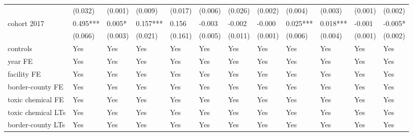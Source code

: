 \begin{table}[H]
{\begin{tabular}{@{}llllllllllll@{}}
            & (0.032)  & (0.001)         & (0.009)    & (0.017)               & (0.006)  & (0.026)   & (0.002)              & (0.004)               & (0.003)                   & (0.001)  & (0.002)   \\
            cohort 2017                 & 0.495*** & 0.005*          & 0.157***   & 0.156                 & -0.003   & -0.002    & -0.000               & 0.025***              & 0.018*** & -0.001 & -0.005*     \\
            & (0.066)  & (0.003)         & (0.021)    & (0.161)               & (0.005)  & (0.011)   & (0.001)              & (0.006)               & (0.004)                   & (0.001)  & (0.002)       \\
            controls                    & Yes      & Yes             & Yes        & Yes                   & Yes      & Yes       & Yes                  & Yes                   & Yes                       & Yes                         & Yes                         \\
            year FE                     & Yes      & Yes             & Yes        & Yes                   & Yes      & Yes       & Yes                  & Yes                   & Yes                       & Yes                         & Yes                         \\
            facility FE                 & Yes      & Yes             & Yes        & Yes                   & Yes      & Yes       & Yes                  & Yes                   & Yes                       & Yes                         & Yes                         \\
            border-county FE            & Yes      & Yes             & Yes        & Yes                   & Yes      & Yes       & Yes                  & Yes                   & Yes                       & Yes                         & Yes                         \\
            toxic chemical FE           & Yes      & Yes             & Yes        & Yes                   & Yes      & Yes       & Yes                  & Yes                   & Yes                       & Yes                         & Yes                         \\
            toxic chemical LTs          & Yes      & Yes             & Yes        & Yes                   & Yes      & Yes       & Yes                  & Yes                   & Yes                       & Yes                         & Yes                         \\
            border-county LTs           & Yes      & Yes             & Yes        & Yes                   & Yes      & Yes       & Yes                  & Yes                   & Yes                       & Yes                         & Yes                         \\ \midrule

\end{tabular}}
\end{table}
